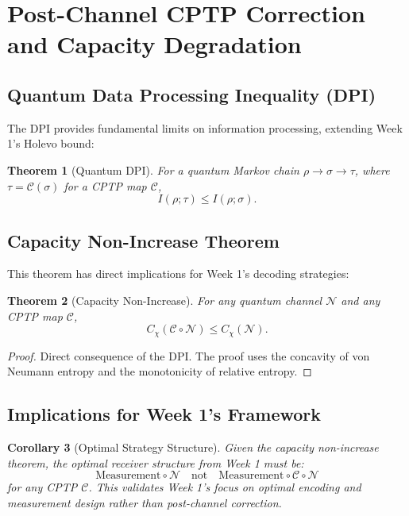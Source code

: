 \documentclass[12pt,a4paper]{article}
\newtheorem{theorem}{Theorem}[section]
\newtheorem{corollary}[theorem]{Corollary}
\begin{document}
\section{Post-Channel CPTP Correction and Capacity Degradation}
\label{sec:post_channel_correction}

\subsection{Quantum Data Processing Inequality (DPI)}
The DPI provides fundamental limits on information processing, extending Week 1's Holevo bound:

\begin{theorem}[Quantum DPI]
    For a quantum Markov chain $\rho \to \sigma \to \tau$, where $\tau = \mathcal{C}(\sigma)$ for a CPTP map $\mathcal{C}$,
    \[
    I(\rho; \tau) \leq I(\rho; \sigma).
    \]
\end{theorem}

\subsection{Capacity Non-Increase Theorem}
This theorem has direct implications for Week 1's decoding strategies:

\begin{theorem}[Capacity Non-Increase]
    For any quantum channel $\mathcal{N}$ and any CPTP map $\mathcal{C}$,
    \[
    C_\chi(\mathcal{C} \circ \mathcal{N}) \leq C_\chi(\mathcal{N}).
    \]
\end{theorem}

\begin{proof}
    Direct consequence of the DPI. The proof uses the concavity of von Neumann entropy and the monotonicity of relative entropy.
\end{proof}

\subsection{Implications for Week 1's Framework}
\begin{corollary}[Optimal Strategy Structure]
    Given the capacity non-increase theorem, the optimal receiver structure from Week 1 must be:
    \[
    \mathrm{Measurement} \circ \mathcal{N} \quad \text{not} \quad \mathrm{Measurement} \circ \mathcal{C} \circ \mathcal{N}
    \]
    for any CPTP $\mathcal{C}$. This validates Week 1's focus on optimal encoding and measurement design rather than post-channel correction.
\end{corollary}
\end{document}
